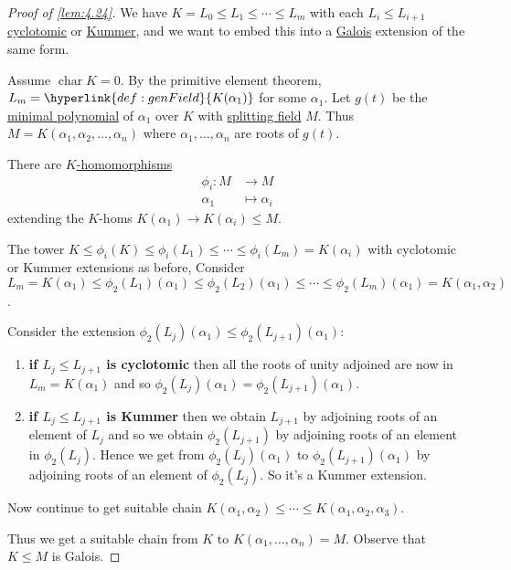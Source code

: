 \documentclass{article}
\DeclareMathOperator{\chara}{char}
\begin{document}
\begin{proof}[Proof of \cref{lem:4.24}]
    We have $K = L_0 \leq L_1 \leq \dotsb \leq L_m$ with each $L_i \leq L_{i+1}$ \hyperlink{def:cycloExt}{cyclotomic} or \hyperlink{def:kummerExt}{Kummer},
    and we want to embed this into a \hyperlink{def:galoisExt}{Galois} extension of the same form.

    Assume $\chara K = 0$. By the primitive element theorem, $L_m = \hyperlink{def:genField}{K(\alpha_1)}$ for some $\alpha_1$.
    Let $g(t)$ be the \hyperlink{def:minimalPoly}{minimal polynomial} of $\alpha_1$ over $K$ with \hyperlink{def:splitting}{splitting field} $M$.
    Thus $M = K(\alpha_1,\alpha_2,\dotsc,\alpha_n)$ where $\alpha_1, \dotsc, \alpha_n$ are roots of $g(t)$.

    There are \hyperlink{def:homo}{$K$-homomorphisms}
    \begin{align*}
        \phi_i : M &\longrightarrow M \\
        \alpha_1 &\longmapsto \alpha_i
    \end{align*}
    extending the $K$-homs $K(\alpha_1) \to K(\alpha_i) \leq M$.

    The tower $K \leq \phi_i(K) \leq \phi_i(L_1) \leq \dotsb \leq \phi_i(L_m) = K(\alpha_i)$ with cyclotomic or Kummer extensions as before,
    Consider $L_m = K(\alpha_1) \leq \phi_2(L_1)(\alpha_1) \leq \phi_2(L_2)(\alpha_1) \leq \dotsb \leq \phi_2(L_m)(\alpha_1) = K(\alpha_1,\alpha_2)$.

    Consider the extension $\phi_2(L_j)(\alpha_1) \leq \phi_2(L_{j+1})(\alpha_1)$:
    \begin{enumerate}[label={}]
        \item \textbf{if $L_j \leq L_{j+1}$ is cyclotomic} then all the roots of unity adjoined are now in $L_m = K(\alpha_1)$ and so $\phi_2(L_j)(\alpha_1) = \phi_2(L_{j+1})(\alpha_1)$.
        \item \textbf{if $L_j \leq L_{j+1}$ is Kummer} then we obtain $L_{j+1}$ by adjoining roots of an element of $L_j$ and so we obtain $\phi_2(L_{j+1})$ by adjoining roots of an element in $\phi_2(L_j)$.
            Hence we get from $\phi_2(L_j)(\alpha_1)$ to $\phi_2(L_{j+1})(\alpha_1)$ by adjoining roots of an element of $\phi_2(L_j)$. So it's a Kummer extension.
    \end{enumerate}

    Now continue to get suitable chain $K(\alpha_1,\alpha_2) \leq \dotsb \leq K(\alpha_1, \alpha_2, \alpha_3)$.

    Thus we get a suitable chain from $K$ to $K(\alpha_1, \dotsc, \alpha_n) = M$.
    Observe that $K \leq M$ is Galois.
\end{proof}
\end{document}
